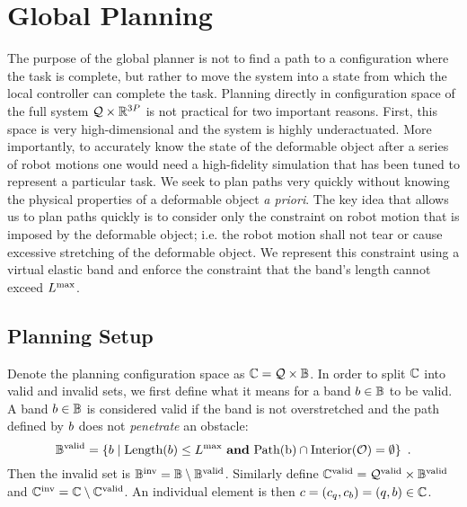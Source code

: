 \section{Global Planning}
\label{sec:global_planning}

The purpose of the global planner is not to find a path to a configuration where the task is complete, but rather to move the system into a state from which the local controller can complete the task. Planning directly in configuration space of the full system $\mathcal{Q} \times \mathbb{R}^{3P}$ is not practical for two important reasons. First, this space is very high-dimensional and the system is highly underactuated. More importantly, to accurately know the state of the deformable object after a series of robot motions one would need a high-fidelity simulation that has been tuned to represent a particular task. We seek to plan paths very quickly without knowing the physical properties of a deformable object \textit{a priori}. The key idea that allows us to plan paths quickly is to consider only the constraint on robot motion that is imposed by the deformable object; i.e. the robot motion shall not tear or cause excessive stretching of the deformable object. We represent this constraint using a virtual elastic band and enforce the constraint that the band's length cannot exceed $L^\textrm{max}$.


\subsection{Planning Setup}


Denote the planning configuration space as $\mathbb{C} = \mathcal{Q} \times \mathbb{B}$. In order to split $\mathbb{C}$ into valid and invalid sets, we first define what it means for a band $b \in \mathbb{B}$ to be valid. A band $b \in \mathbb{B}$ is considered valid if the band is not overstretched and the path defined by $b$ does not \textit{penetrate} an obstacle:
\begin{equation}
    \mathbb{B}^{\textrm{valid}} = \{ b \mid \textrm{Length}(b) \leq L^\textrm{max} \textrm{ \textbf{and} } 
                                    \textrm{Path(b)} \cap \textrm{Interior}(\mathcal{O}) = \emptyset \} \enspace .
\end{equation}
Then the invalid set is $\mathbb{B}^{\textrm{inv}} = \mathbb{B} \setminus \mathbb{B}^{\textrm{valid}}$. Similarly define $\mathbb{C}^\textrm{valid} = \mathcal{Q}^{\textrm{valid}} \times \mathbb{B}^{\textrm{valid}}$ and $\mathbb{C}^\textrm{inv} = \mathbb{C} \setminus \mathbb{C}^\textrm{valid}$. An individual element is then $c = (c_q, c_b) = (q, b) \in \mathbb{C}$.

